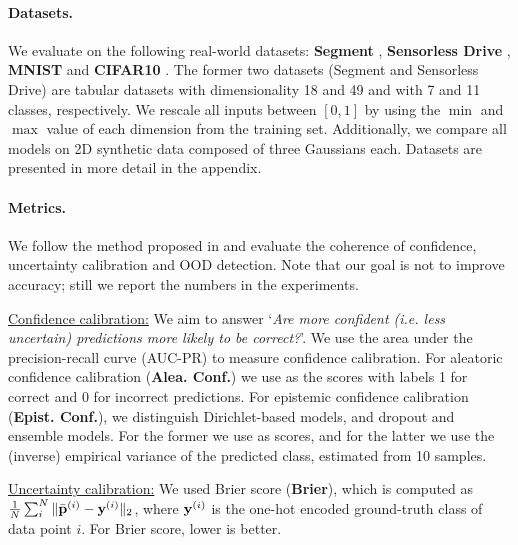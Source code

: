 \paragraph{Datasets.} We evaluate on the following real-world datasets: \textbf{Segment} \cite{uci_datasets}, \textbf{Sensorless Drive} \cite{uci_datasets}, \textbf{MNIST} \cite{mnist} and \textbf{CIFAR10} \cite{cifar10}. The former two datasets (Segment and Sensorless Drive) are tabular datasets with %
dimensionality 18 and 49 and with 7 and 11 classes, respectively. We rescale all inputs between $[0, 1]$ by using the $\min$ and $\max$ value of each dimension from the training set. Additionally, we compare all models on 2D synthetic data composed of three Gaussians each. Datasets are presented in  more detail in the appendix.

\paragraph{Metrics.} We follow the method proposed in \cite{dataset-shift} and evaluate the coherence of confidence, uncertainty calibration and OOD detection. Note that our goal is not to improve accuracy; still we report the numbers in the experiments.

\underline{Confidence calibration:} We aim to answer `\textit{Are more confident (i.e. less uncertain) predictions more likely to be correct?}'. We use the area under the precision-recall curve (AUC-PR) to measure confidence calibration. For aleatoric confidence calibration (\textbf{Alea. Conf.}) we use  as the scores with labels 1 for correct and 0 for incorrect predictions. For epistemic confidence calibration (\textbf{Epist. Conf.}), we distinguish Dirichlet-based models, and dropout and ensemble models. For the former we use \smash{$\underset{\iclass}{\max}\; \bm{\alpha}_\iclass\dataix$} as scores, and for the latter we use the (inverse) empirical variance  of the predicted class, estimated from 10 samples.

\underline{Uncertainty calibration:} We used Brier score (\textbf{Brier}), which is computed as $\frac{1}{N}\sum_{i}^N \|\bar{\mathbf{p}}^{(i)} - \mathbf{y}^{(i)}\|_2$, where $\mathbf{y}^{(i)}$ is the one-hot encoded ground-truth class of data point $i$. For Brier score, lower is better.

